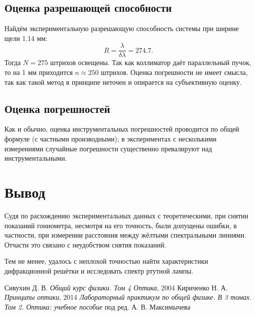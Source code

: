 \documentclass[a4paper]{article}
\begin{document}
\subsection{Оценка разрешающей способности}

Найдём экспериментальную разрешающую способность системы при ширине щели 1.14 мм:
\begin{equation*}\label{key}
	R = \frac{\lambda}{\delta \lambda} = 274.7.
\end{equation*}
Тогда $ N =275 $ штрихов освещены. Так как коллиматор даёт параллельный пучок, то на 1 мм приходится $ n\approx 250 $ штрихов. Оценка погрешности не имеет смысла, так как такой метод в принципе неточен и опирается на субъективную оценку.

\subsection{Оценка погрешностей}

Как и обычно, оценка инструментальных погрешностей проводится по общей формуле (с частными производными); в экспериментах с несколькими измерениями случайные погрешности существенно превалируют над инструментальными. 

\section{Вывод}

Судя по расхождению экспериментальных данных с теоретическими, при снятии показаний гониометра, несмотря на его точность, были допущены ошибки, в частности, при измерении расстояния между жёлтыми спектральными линиями. Отчасти это связано с неудобством снятия показаний.

Тем не менее, удалось с неплохой точностью найти характеристики дифракционной решётки и исследовать спектр ртутной лампы.

\newpage
\begin{thebibliography}{9}
	 Сивухин Д. В. \emph{Общий курс физики. Том 4 Оптика}, 2004
	 Кириченко Н. А. \emph{Принципы оптики}, 2014
	 \emph{Лабораторный практикум по общей физике. В 3 томах. Том 2. Оптика: учебное пособие} под ред. А. В. Максимычева
\end{thebibliography}
\end{document}
